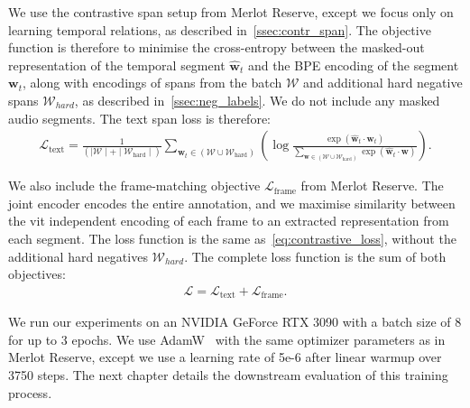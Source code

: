 We use the contrastive span setup from Merlot Reserve, except we focus only on
learning temporal relations, as described in~\cref{ssec:contr_span}. The
objective function is therefore to minimise the cross-entropy between the
masked-out representation of the temporal segment $\mathbf{\hat{w}}_t$ and the
BPE encoding of the segment $\mathbf{w}_t$, along with encodings of spans from
the batch $\mathcal{W}$ and additional hard negative spans $\mathcal{W}_{hard}$, as described
in~\cref{ssec:neg_labels}. We do not include any masked audio segments.
The text span loss is therefore:
\begin{align}
	\label{eq:contrastive_loss}
	\mathcal{L}_{\mathrm{text}} = \frac{1}{( \mid\mathcal{W}\mid + \mid\mathcal{W}_{\mathrm{hard}}\mid )}
	\sum_{\mathbf{w}_t \in (\mathcal{W} \cup \mathcal{W}_{\mathrm{hard}})} 
	\left( \log	\frac{\exp(\mathbf{\hat{w}}_t \cdot \mathbf{w}_t)}
	{\sum_{\mathbf{w}\in(\mathcal{W}\cup\mathcal{W}_{\mathrm{hard}})} \exp(\mathbf{\hat{w}}_t \cdot \mathbf{w})} \right)
.\end{align}

We also include the frame-matching objective $\mathcal{L}_\mathrm{frame}$ from Merlot Reserve. The joint
encoder encodes the entire annotation, and we maximise similarity between the
\acrshort{vit} independent encoding of each frame to an extracted
representation from each segment. The loss function is the same
as~\cref{eq:contrastive_loss}, without the additional hard negatives $\mathcal{W}_{hard}$.
The complete loss function is the sum of both objectives:
\begin{align}
	\label{eq:total_loss}
	\mathcal{L} = \mathcal{L}_{\mathrm{text}} + \mathcal{L}_{\mathrm{frame}}
.\end{align}

We run our experiments on an NVIDIA GeForce RTX 3090 with a batch size of 8 for
up to 3 epochs. We use AdamW~\citep{loshchilov2019adamw} with the same
optimizer parameters as in Merlot Reserve, except we use a learning rate of
5e-6 after linear warmup over 3750 steps. The next chapter details the
downstream evaluation of this training process.
